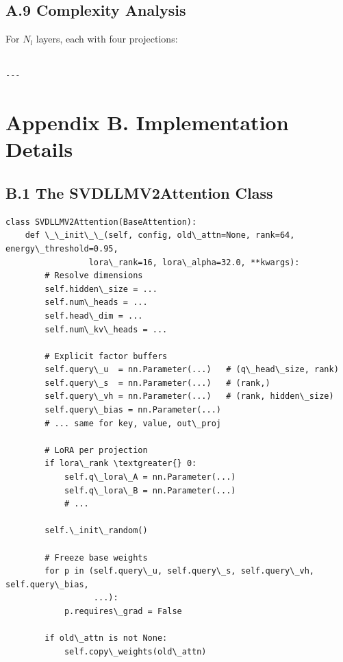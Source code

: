 \subsection{A.9 Complexity Analysis}

For $N_l$ layers, each with four projections:

\begin{lstlisting}

---
\end{lstlisting}


\section{Appendix B. Implementation Details}

\subsection{B.1 The SVDLLMV2Attention Class}

\begin{lstlisting}
class SVDLLMV2Attention(BaseAttention):
    def \_\_init\_\_(self, config, old\_attn=None, rank=64, energy\_threshold=0.95,
                 lora\_rank=16, lora\_alpha=32.0, **kwargs):
        # Resolve dimensions
        self.hidden\_size = ...
        self.num\_heads = ...
        self.head\_dim = ...
        self.num\_kv\_heads = ...
        
        # Explicit factor buffers
        self.query\_u  = nn.Parameter(...)   # (q\_head\_size, rank)
        self.query\_s  = nn.Parameter(...)   # (rank,)
        self.query\_vh = nn.Parameter(...)   # (rank, hidden\_size)
        self.query\_bias = nn.Parameter(...)
        # ... same for key, value, out\_proj
        
        # LoRA per projection
        if lora\_rank \textgreater{} 0:
            self.q\_lora\_A = nn.Parameter(...)
            self.q\_lora\_B = nn.Parameter(...)
            # ...
        
        self.\_init\_random()
        
        # Freeze base weights
        for p in (self.query\_u, self.query\_s, self.query\_vh, self.query\_bias,
                  ...):
            p.requires\_grad = False
        
        if old\_attn is not None:
            self.copy\_weights(old\_attn)
\end{lstlisting}

